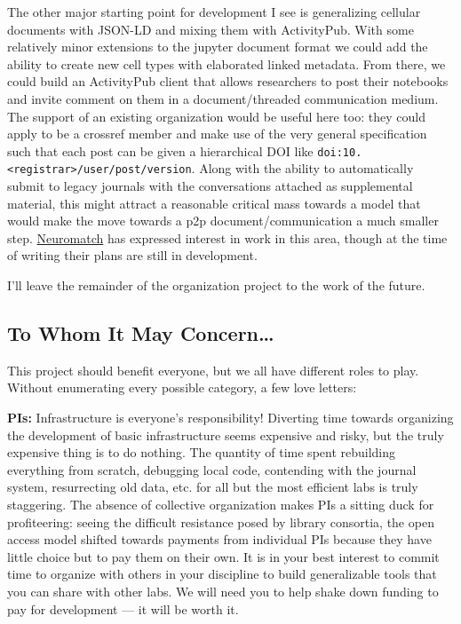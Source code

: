 The other major starting point for development I see is generalizing
cellular documents with JSON-LD and mixing them with ActivityPub. With
some relatively minor extensions to the jupyter document format we could
add the ability to create new cell types with elaborated linked
metadata. From there, we could build an ActivityPub client that allows
researchers to post their notebooks and invite comment on them in a
document/threaded communication medium. The support of an existing
organization would be useful here too: they could apply to be a crossref
member and make use of the very general specification \citep{isoISO2632420122012}  such that each post can be given a hierarchical
DOI like
\texttt{doi:10.\textless{}registrar\textgreater{}/user/post/version}.
Along with the ability to automatically submit to legacy journals with
the conversations attached as supplemental material, this might attract
a reasonable critical mass towards a model that would make the move
towards a p2p document/communication a much smaller step.
\href{https://neuromatch.io/}{Neuromatch} \citep{achakulvisutDemocratizingAutomatingOnline2021, kordingLoveNeuroscienceNeuromatch2021, vanviegenNeuromatchAcademyTeaching2021}  has expressed interest in
work in this area, though at the time of writing their plans are still
in development.

I'll leave the remainder of the organization project to the work of the
future.

\hypertarget{to-whom-it-may-concern}{%
\subsection{To Whom It May
Concern\ldots{}}\label{to-whom-it-may-concern}}

This project should benefit everyone, but we all have different roles to
play. Without enumerating every possible category, a few love letters:

\textbf{PIs:} Infrastructure is everyone's responsibility! Diverting
time towards organizing the development of basic infrastructure seems
expensive and risky, but the truly expensive thing is to do nothing. The
quantity of time spent rebuilding everything from scratch, debugging
local code, contending with the journal system, resurrecting old data,
etc. for all but the most efficient labs is truly staggering. The
absence of collective organization makes PIs a sitting duck for
profiteering: seeing the difficult resistance posed by library
consortia, the open access model shifted towards payments from
individual PIs because they have little choice but to pay them on their
own. It is in your best interest to commit time to organize with others
in your discipline to build generalizable tools that you can share with
other labs. We will need you to help shake down funding to pay for
development --- it will be worth it.

